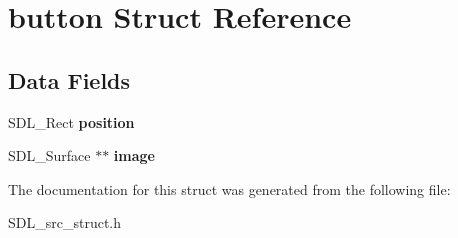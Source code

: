 \hypertarget{structbutton}{}\section{button Struct Reference}
\label{structbutton}
\subsection*{Data Fields}
\begin{DoxyCompactItemize}
\item 
\mbox{\label{structbutton_a871c5f530b6eb0be33af2939d170d1ba}} 
S\+D\+L\+\_\+\+Rect {\bfseries position}
\item 
\mbox{\label{structbutton_a4e68c56f6e02d4cc64a320b5ef8e939f}} 
S\+D\+L\+\_\+\+Surface $\ast$$\ast$ {\bfseries image}
\end{DoxyCompactItemize}


The documentation for this struct was generated from the following file\+:\begin{DoxyCompactItemize}
\item 
S\+D\+L\+\_\+src\+\_\+struct.\+h\end{DoxyCompactItemize}

